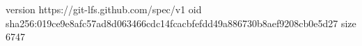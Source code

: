 version https://git-lfs.github.com/spec/v1
oid sha256:019ce9e8afc57ad8d063466cdc14fcacbfefdd49a886730b8aef9208cb0e5d27
size 6747
